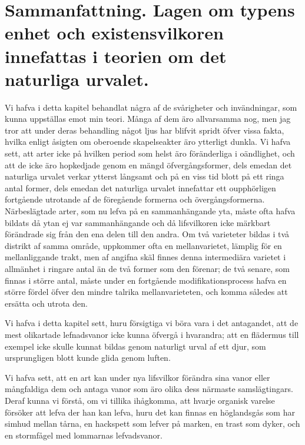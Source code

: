 \section[Sammanfattning]{Sammanfattning. Lagen om typens enhet och
existensvilkoren innefattas i teorien om det
naturliga urvalet.}

Vi hafva i detta kapitel behandlat några af de svårigheter och invändningar, som kunna uppställas emot min teori. Många af dem äro allvarsamma nog, men jag tror att under deras behandling något ljus har blifvit spridt öfver vissa fakta, hvilka enligt åsigten om oberoende skapelseakter äro ytterligt dunkla. Vi hafva sett, att arter icke på hvilken period som helst äro föränderliga i oändlighet, och att de icke äro hopkedjade genom en mängd öfvergångsformer, dels emedan det naturliga urvalet verkar ytterst långsamt och på en viss tid blott på ett ringa antal former, dels emedan det naturliga urvalet innefattar ett oupphörligen fortgående utrotande af de föregående formerna och övergångsformerna. Närbeslägtade arter, som nu lefva på en sammanhängande yta, måste ofta hafva bildats då ytan ej var sammanhängande och då lifsvilkoren icke märkbart förändrade sig från den ena delen till den andra. Om två varieteter bildas i två distrikt af samma område, uppkommer ofta en mellanvarietet, lämplig för en mellanliggande trakt, men af angifna skäl finnes denna intermediära varietet i allmänhet i ringare antal än de två former som den förenar; de två senare, som finnas i större antal, måste under en fortgående modifikationsprocess hafva en större fördel öfver den mindre talrika mellanvarieteten, och komma således att ersätta och utrota den.

Vi hafva i detta kapitel sett, huru försigtiga vi böra vara i det antagandet, att de mest olikartade lefnadsvanor icke kunna öfvergå i hvarandra; att en flädermus till exempel icke skulle kunnat bildas genom naturligt urval af ett djur, som ursprungligen blott kunde glida genom luften.

Vi hafva sett, att en art kan under nya lifsvilkor förändra sina vanor eller mångfaldiga dem och antaga vanor som äro olika dess närmaste samslägtingars. Deraf kunna vi förstå, om vi tillika ihågkomma, att hvarje organisk varelse försöker att lefva der han kan lefva, huru det kan finnas en höglandsgås som har simhud mellan tårna, en hackspett som lefver på marken, en trast som dyker, och en stormfågel med lommarnas lefvadsvanor.


